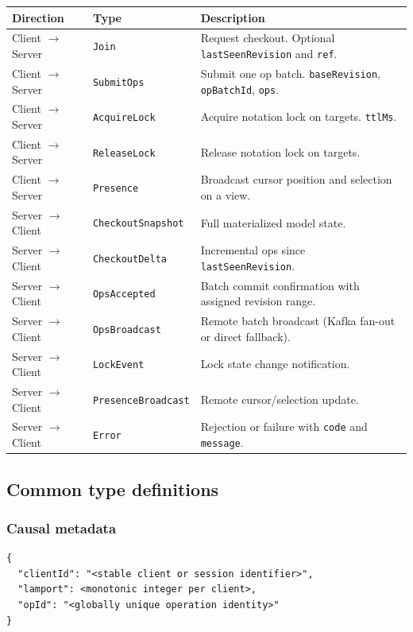 \begin{longtable}{p{30mm}p{30mm}p{94mm}}
\toprule
Direction & Type & Description \\
\midrule
Client $\to$ Server & \texttt{Join} & Request checkout. Optional
  \texttt{lastSeenRevision} and \texttt{ref}. \\
Client $\to$ Server & \texttt{SubmitOps} & Submit one op batch.
  \texttt{baseRevision}, \texttt{opBatchId}, \texttt{ops}. \\
Client $\to$ Server & \texttt{AcquireLock} & Acquire notation lock on
  targets. \texttt{ttlMs}. \\
Client $\to$ Server & \texttt{ReleaseLock} & Release notation lock on
  targets. \\
Client $\to$ Server & \texttt{Presence} & Broadcast cursor position and
  selection on a view. \\
\midrule
Server $\to$ Client & \texttt{CheckoutSnapshot} & Full materialized model
  state. \\
Server $\to$ Client & \texttt{CheckoutDelta} & Incremental ops since
  \texttt{lastSeenRevision}. \\
Server $\to$ Client & \texttt{OpsAccepted} & Batch commit confirmation with
  assigned revision range. \\
Server $\to$ Client & \texttt{OpsBroadcast} & Remote batch broadcast (Kafka
  fan-out or direct fallback). \\
Server $\to$ Client & \texttt{LockEvent} & Lock state change notification. \\
Server $\to$ Client & \texttt{PresenceBroadcast} & Remote cursor/selection
  update. \\
Server $\to$ Client & \texttt{Error} & Rejection or failure with
  \texttt{code} and \texttt{message}. \\
\bottomrule
\end{longtable}

\subsection{Common type definitions}

\subsubsection{Causal metadata}

\begin{lstlisting}[caption={Causal object}]
{
  "clientId": "<stable client or session identifier>",
  "lamport": <monotonic integer per client>,
  "opId": "<globally unique operation identity>"
}
\end{lstlisting}

